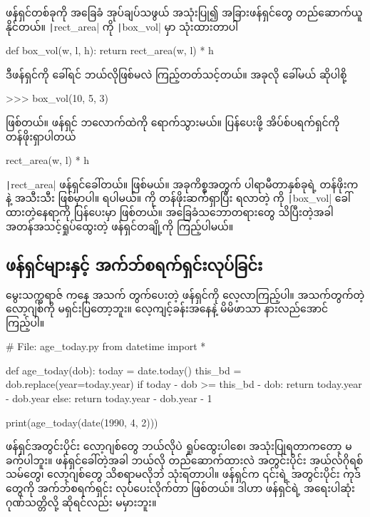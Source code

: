 ဖန်ရှင်တစ်ခုကို အခြေခံ အုပ်ချပ်သဖွယ် အသုံးပြု၍ အခြားဖန်ရှင်တွေ တည်ဆောက်ယူနိုင်တယ်။ \texttt|rect_area| ကို \texttt|box_vol| မှာ သုံးထားတာပါ
\begin{codetxt}
def box_vol(w, l, h):
    return rect_area(w, l) * h
\end{codetxt}
ဒီဖန်ရှင်ကို ခေါ်ရင် ဘယ်လိုဖြစ်မလဲ ကြည့်တတ်သင့်တယ်။ အခုလို ခေါ်မယ် ဆိုပါစို့
\begin{codetxt}
>>> box_vol(10, 5, 3)
\end{codetxt}
\fEn{,} \fEn{,}  ဖြစ်တယ်။ ဖန်ရှင် ဘလောက်ထဲကို ရောက်သွားမယ်။  ပြန်ပေးဖို့ အိပ်စ်ပရက်ရှင်ကို တန်ဖိုးရှာပါတယ်
\begin{codetxt}
rect_area(w, l) * h
\end{codetxt}
\texttt|rect_area| ဖန်ရှင်ခေါ်တယ်။ \fEn{,}  ဖြစ်မယ်။ အခုကိစ္စအတွက် ပါရာမီတာနှစ်ခုရဲ့ တန်ဖိုးက  နဲ့  အသီးသီး ဖြစ်မှာပါ။    ရပါမယ်။  ကို တန်ဖိုးဆက်ရှာပြီး ရလာတဲ့  ကို \texttt|box_vol| ခေါ်ထားတဲ့နေရာကို  ပြန်ပေးမှာ ဖြစ်တယ်။ အခြေခံသဘောတရားတွေ သိပြီးတဲ့အခါ အတန်အသင့်ရှုပ်ထွေးတဲ့ ဖန်ရှင်တချို့ကို ကြည့်ပါမယ်။

\subsection*{ဖန်ရှင်များနှင့် အက်ဘ်စရက်ရှင်းလုပ်ခြင်း}
မွေးသက္ကရာဇ်   ကနေ အသက် တွက်ပေးတဲ့ ဖန်ရှင်ကို လေ့လာကြည့်ပါ။ အသက်တွက်တဲ့ လော့ဂျစ်ကို မရှင်းပြတော့ဘူး။ လေ့ကျင့်ခန်းအနေနဲ့ မိမိဖာသာ နားလည်အောင်ကြည့်ပါ။
%
\begin{py}
# File: age_today.py
from datetime import *

def age_today(dob):
    today = date.today()
    this_bd = dob.replace(year=today.year)
    if today - dob >= this_bd - dob:
        return today.year - dob.year
    else:
        return today.year - dob.year - 1

print(age_today(date(1990, 4, 2)))
\end{py}
%
ဖန်ရှင်အတွင်းပိုင်း လော့ဂျစ်တွေ ဘယ်လိုပဲ ရှုပ်ထွေးပါစေ၊ အသုံးပြုရတာကတော့ မခက်ပါဘူး။ ဖန်ရှင်ခေါ်တဲ့အခါ ဘယ်လို တည်ဆောက်ထားလဲ အတွင်းပိုင်း အယ်လ်ဂိုရစ်သမ်တွေ၊ လော့ဂျစ်တွေ သိစရာမလိုဘဲ သုံးရတာပါ။ ဖန်ရှင်က ၎င်းရဲ့ အတွင်းပိုင်း ကုဒ်တွေကို အက်ဘ်စရက်ရှင်း  လုပ်ပေးလိုက်တာ ဖြစ်တယ်။ ဒါဟာ ဖန်ရှင်ရဲ့ အရေးပါဆုံး ဂုဏ်သတ္တိလို့ ဆိုရင်လည်း မမှားဘူး။ 

   

